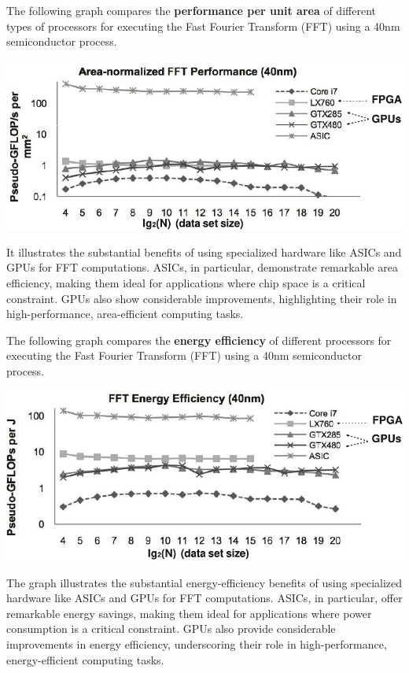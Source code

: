 \begin{examplebox}
    The following graph compares the \textbf{performance per unit area} of different types of processors for executing the Fast Fourier Transform (FFT) using a 40nm semiconductor process.

    \begin{center}
        \includegraphics[width=\textwidth]{img/fft-example-1.pdf}
    \end{center}

    It illustrates the substantial benefits of using specialized hardware like ASICs and GPUs for FFT computations. ASICs, in particular, demonstrate remarkable area efficiency, making them ideal for applications where chip space is a critical constraint. GPUs also show considerable improvements, highlighting their role in high-performance, area-efficient computing tasks.

    \highspace
    The following graph compares the \textbf{energy efficiency} of different processors for executing the Fast Fourier Transform (FFT) using a 40nm semiconductor process.

    \begin{center}
        \includegraphics[width=\textwidth]{img/fft-example-2.pdf}
    \end{center}
    The graph illustrates the substantial energy-efficiency benefits of using specialized hardware like ASICs and GPUs for FFT computations. ASICs, in particular, offer remarkable energy savings, making them ideal for applications where power consumption is a critical constraint. GPUs also provide considerable improvements in energy efficiency, underscoring their role in high-performance, energy-efficient computing tasks.
\end{examplebox}

